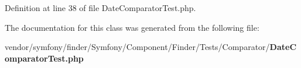 Definition at line 38 of file Date\+Comparator\+Test.\+php.



The documentation for this class was generated from the following file\+:\begin{DoxyCompactItemize}
\item 
vendor/symfony/finder/\+Symfony/\+Component/\+Finder/\+Tests/\+Comparator/{\bf Date\+Comparator\+Test.\+php}\end{DoxyCompactItemize}
